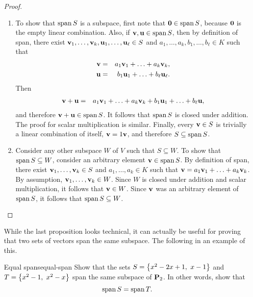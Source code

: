 \begin{proof}
  \begin{enumialphparenastyle}
    \begin{enumerate}
    \item To show that $\sspan S$ is a subspace, first note that
      $\vect{0}\in\sspan S$, because $\vect{0}$ is the empty linear
      combination. Also, if $\vect{v},\vect{u}\in\sspan S$, then by
      definition of span, there exist
      $\vect{v}_1,\ldots,\vect{v}_k,\vect{u}_1,\ldots,\vect{u}_{\ell}\in
      S$ and $a_1,\ldots,a_k,b_1,\ldots,b_{\ell}\in K$ such that
      \begin{eqnarray*}
        \vect{v} &=& a_1\vect{v}_1 + \ldots + a_k\vect{v}_k, \\
        \vect{u} &=& b_1\vect{u}_1 + \ldots + b_{\ell}\vect{u}_{\ell}.
      \end{eqnarray*}
      Then
      \begin{eqnarray*}
        \vect{v}+\vect{u}
        &=& a_1\vect{v}_1 + \ldots + a_k\vect{v}_k
            + b_1\vect{u}_1 + \ldots + b_{\ell}\vect{u},
      \end{eqnarray*}
      and therefore $\vect{v}+\vect{u}\in\sspan S$. It follows that
      $\sspan S$ is closed under addition. The proof for scalar
      multiplication is similar. Finally, every $\vect{v}\in S$ is
      trivially a linear combination of itself, $\vect{v}=1\vect{v}$,
      and therefore $S\subseteq \sspan S$.
    \item Consider any other subspace $W$ of $V$ such that
      $S\subseteq W$. To show that $\sspan S\subseteq W$, consider an
      arbitrary element $\vect{v}\in\sspan S$. By definition of span,
      there exist $\vect{v}_1,\ldots,\vect{v}_k\in S$ and
      $a_1,\ldots,a_k\in K$ such that
      $\vect{v}=a_1\vect{v}_1 + \ldots + a_k\vect{v}_k$. By
      assumption, $\vect{v}_1,\ldots,\vect{v}_k\in W$. Since $W$ is
      closed under addition and scalar multiplication, it follows that
      $\vect{v}\in W$. Since $\vect{v}$ was an arbitrary element of
      $\sspan S$, it follows that $\sspan S\subseteq W$.
    \end{enumerate}
  \end{enumialphparenastyle}
\end{proof}

While the last proposition looks technical, it can actually be useful
for proving that two sets of vectors span the same subspace. The
following in an example of this.

\begin{example}{Equal spans}{equal-span}
  Show that the sets $S=\left\{x^2-2x+1,~ x-1\right\}$ and
  $T=\left\{x^2-1,~ x^2-x\right\}$ span the same subspace of $\mathbf{P}_2$. In other
  words, show that
  \begin{equation*}
    \sspan S = \sspan T.
  \end{equation*}
\end{example}

